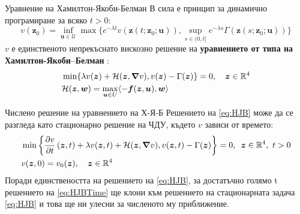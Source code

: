 \begin{frame}[c]{Уравнение на Хамилтон-Якоби-Белман}
  В сила е принцип за динамично програмиране за всяко $t>0$:
  \begin{equation*}
    v(\boldsymbol{z}_0) = \inf_{\boldsymbol{u} \in \mathcal{U}} \max\{e^{-\lambda t} v(\boldsymbol{z}(t; \boldsymbol{z}_0; \boldsymbol{u})), \sup_{s \in (0, t]} e^{-\lambda s} \Gamma(\boldsymbol{z}(s; \boldsymbol{z}_0; \boldsymbol{u}))\}
  \end{equation*}
  $v$ е единственото непрекъснато вискозно решение на \textbf{уравнението от типа на Хамилтон-Якоби–Белман} :
  \begin{equation}
    \begin{split}
      \label{eq:HJB}
      &\min\{\lambda v(\boldsymbol{z}) + \mathcal{H}(\boldsymbol{z}, \grad{v}), v(\boldsymbol{z}) - \Gamma(\boldsymbol{z}) \} = 0, \quad \boldsymbol{z} \in \mathbb{R}^4 \\
      &\mathcal{H}(\boldsymbol{z}, \boldsymbol{w}) = \max_{\boldsymbol{u} \in U} \langle -\boldsymbol{f}(\boldsymbol{z}, \boldsymbol{u}), \boldsymbol{w} \rangle
    \end{split}
  \end{equation}
\end{frame}

\begin{frame}[c]{Числено решение на уравнението на Х-Я-Б}
  Решението на \eqref{eq:HJB} може да се разгледа като стационарно решение на ЧДУ, където $v$ зависи от времето:
  \begin{equation}
    \label{eq:HJBTime}
    \begin{split}
      &\min\left\{\pdv{v}{t}\left(\boldsymbol{z}, t\right) + \lambda v(\boldsymbol{z}, t) + \mathcal{H}(\boldsymbol{z}, \grad{v}), v(\boldsymbol{z}, t) - \Gamma(\boldsymbol{z})\right\} = 0, \hspace{0.5em} \boldsymbol{z} \in \mathbb{R}^4,~ t>0 \\
      &v(\boldsymbol{z}, 0) = v_0(\boldsymbol{z}), \quad \boldsymbol{z} \in \mathbb{R}^4 \\
    \end{split}
  \end{equation}
  Поради единствеността на решението на \eqref{eq:HJB}, за достатъчно голямо t решението на \eqref{eq:HJBTime} ще клони към решението на стационарната задача \eqref{eq:HJB} и това ще ни улесни за численото му приближение.
\end{frame}


